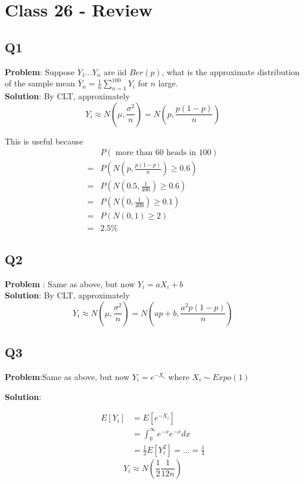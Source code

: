 \chapter{Class 26 - Review}

\section{Q1} 
\textbf{Problem}: Suppose $Y_1 \hdots Y_n$ are iid $Ber(p)$, what is the approximate distribution of the sample mean  $\overline{Y}_n = \frac{1}{n} \sum_{n = 1}^{100}Y_i$  for $n$ large. \\

\textbf{Solution}: By CLT, approximately
\[
  Y_i \approx N \left( \mu, \frac{\sigma^2}{n} \right)  = N \left( p , \frac{p(1-p)}{n} \right) 
\] 

This is useful because 
\begin{align*}
   &P \left( \text{ more than 60 heads in 100} \right)  \\
   =& P \left( N \left( p, \frac{p (1-p)}{n} \right)   \geq 0.6\right)   \\
   =& P \left( N \left( 0.5, \frac{1}{400} \right)   \geq 0.6\right)   \\
   =& P \left( N \left( 0, \frac{1}{400} \right)   \geq 0.1\right)   \\
   =& P \left( N \left( 0, 1 \right)   \geq 2\right)   \\
   =& 2.5\%
\end{align*}

\section{Q2}

\textbf{Problem }: Same as above, but now $Y_i = aX_i + b$ \\

\textbf{Solution}: By CLT, approximately
\[
  Y_i \approx N \left( \mu, \frac{\sigma^2}{n} \right)  = N \left( a p + b, \frac{a^2 p(1-p)}{n} \right) 
\] 

\section{Q3}

\textbf{Problem}:Same as above, but now $Y_i = e^{-X_i}$ where $X_i \sim Expo(1)$

 \textbf{Solution}: 

 \begin{align*}
    E\left[ Y_i\right] &= E\left[ e^{-X_i}\right]  \\
                       &= \int_{0}^{\infty} e^{-x} e^{-x} dx \\
                       &= \frac{1}{2}
                       E\left[ Y_i^2\right]  = \hdots = \frac{1}{3}
 \end{align*}
 \[
   Y_i \approx N \left( \frac{1}{2} \frac{1}{12n} \right) 
 \] 

